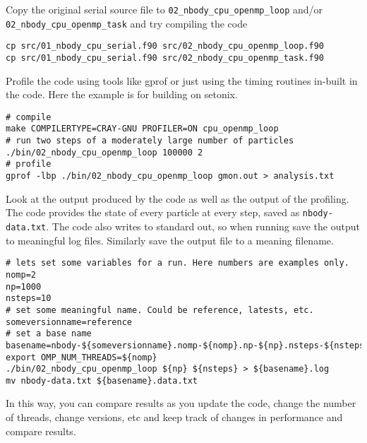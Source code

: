 \documentclass[11pt]{amsart}
\begin{document}
Copy the original serial source file to \texttt{02\_nbody\_cpu\_openmp\_loop} and/or \texttt{02\_nbody\_cpu\_openmp\_task} and try compiling the code
\begin{center}
\begin{minipage}{0.95\textwidth}
\begin{verbatim}
cp src/01_nbody_cpu_serial.f90 src/02_nbody_cpu_openmp_loop.f90
cp src/01_nbody_cpu_serial.f90 src/02_nbody_cpu_openmp_task.f90
\end{verbatim}
\end{minipage}
\end{center}
Profile the code using tools like gprof or just using the timing routines in-built in the code. 
Here the example is for building on setonix.
\begin{center}
\begin{minipage}{0.95\textwidth}
\begin{verbatim}
# compile
make COMPILERTYPE=CRAY-GNU PROFILER=ON cpu_openmp_loop
# run two steps of a moderately large number of particles 
./bin/02_nbody_cpu_openmp_loop 100000 2
# profile
gprof -lbp ./bin/02_nbody_cpu_openmp_loop gmon.out > analysis.txt
\end{verbatim}
\end{minipage}
\end{center}
Look at the output produced by the code as well as the output of the profiling. The code provides the state of every particle at every step, saved as {\color{blue}\texttt{nbody-data.txt}}. The code also writes to standard out, so when running save the output to meaningful log files. Similarly save the output file to a meaning filename.
\begin{center}
\begin{minipage}{0.95\textwidth}
\begin{verbatim}
# lets set some variables for a run. Here numbers are examples only.
nomp=2
np=1000
nsteps=10
# set some meaningful name. Could be reference, latests, etc.
someversionname=reference
# set a base name
basename=nbody-${someversionname}.nomp-${nomp}.np-${np}.nsteps-${nsteps}
export OMP_NUM_THREADS=${nomp}
./bin/02_nbody_cpu_openmp_loop ${np} ${nsteps} > ${basename}.log
mv nbody-data.txt ${basename}.data.txt
\end{verbatim}
\end{minipage}
\end{center}
In this way, you can compare results as you update the code, change the number of threads, change versions, etc and keep track of changes in performance and compare results.
\end{document}
